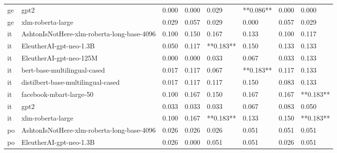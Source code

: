 \begin{tabular}{llllllll}
      ge &                                       gpt2 & 0.000 &                     0.000 &                 0.029 &              **0.086** &                                   0.000 &     0.000 \\
      ge &                          xlm-roberta-large & 0.029 &                     0.057 &                 0.029 &                  0.000 &                                   0.057 &     0.029 \\
      it & AshtonIsNotHere-xlm-roberta-long-base-4096 & 0.100 &                     0.150 &                 0.167 &                  0.133 &                                   0.100 &     0.117 \\
      it &                    EleutherAI-gpt-neo-1.3B & 0.050 &                     0.117 &             **0.183** &                  0.150 &                                   0.133 &     0.133 \\
      it &                    EleutherAI-gpt-neo-125M & 0.000 &                     0.000 &                 0.033 &                  0.067 &                                   0.033 &     0.133 \\
      it &               bert-base-multilingual-cased & 0.017 &                     0.117 &                 0.067 &              **0.183** &                                   0.117 &     0.133 \\
      it &         distilbert-base-multilingual-cased & 0.017 &                     0.117 &                 0.117 &                  0.150 &                                   0.083 &     0.133 \\
      it &                    facebook-mbart-large-50 & 0.100 &                     0.167 &                 0.150 &                  0.167 &                                   0.167 & **0.183** \\
      it &                                       gpt2 & 0.033 &                     0.033 &                 0.033 &                  0.067 &                                   0.083 &     0.050 \\
      it &                          xlm-roberta-large & 0.100 &                     0.167 &             **0.183** &                  0.133 &                                   0.150 & **0.183** \\
      po & AshtonIsNotHere-xlm-roberta-long-base-4096 & 0.026 &                     0.026 &                 0.026 &                  0.051 &                                   0.051 &     0.051 \\
      po &                    EleutherAI-gpt-neo-1.3B & 0.026 &                     0.000 &                 0.051 &                  0.051 &                                   0.026 &     0.051 \\

\end{tabular}
